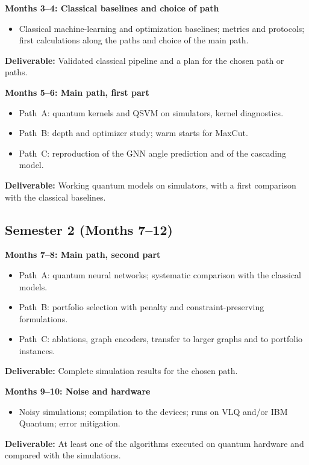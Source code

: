 \documentclass[12pt,a4paper]{article}
\begin{document}
\bigskip

\textbf{Months 3--4: Classical baselines and choice of path}
\begin{itemize}
    \item Classical machine-learning and optimization baselines;
    metrics and protocols; first calculations along the paths and
    choice of the main path.
\end{itemize}
\textbf{Deliverable:} Validated classical pipeline and a plan for the
chosen path or paths.

\bigskip

\textbf{Months 5--6: Main path, first part}
\begin{itemize}
    \item Path~A: quantum kernels and QSVM on simulators, kernel
    diagnostics.
    \item Path~B: depth and optimizer study; warm starts for MaxCut.
    \item Path~C: reproduction of the GNN angle prediction and of the
    cascading model.
\end{itemize}
\textbf{Deliverable:} Working quantum models on simulators, with a
first comparison with the classical baselines.

\subsection*{Semester 2 (Months 7--12)}

\textbf{Months 7--8: Main path, second part}
\begin{itemize}
    \item Path~A: quantum neural networks; systematic comparison with
    the classical models.
    \item Path~B: portfolio selection with penalty and
    constraint-preserving formulations.
    \item Path~C: ablations, graph encoders, transfer to larger
    graphs and to portfolio instances.
\end{itemize}
\textbf{Deliverable:} Complete simulation results for the chosen path.

\bigskip

\textbf{Months 9--10: Noise and hardware}
\begin{itemize}
    \item Noisy simulations; compilation to the devices; runs on VLQ
    and/or IBM Quantum; error mitigation.
\end{itemize}
\textbf{Deliverable:} At least one of the algorithms executed on
quantum hardware and compared with the simulations.
\end{document}
